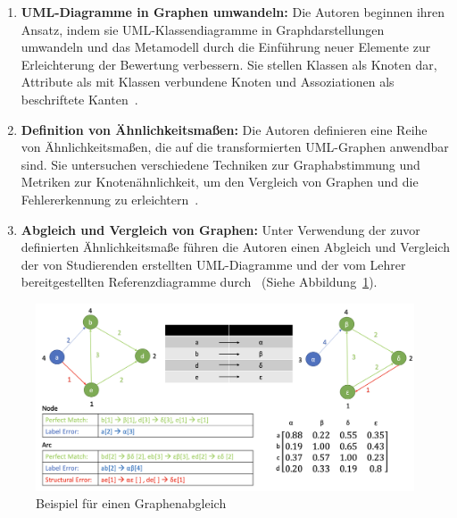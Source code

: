 \begin{enumerate}
    \item \textbf{UML-Diagramme in Graphen umwandeln:} Die Autoren beginnen ihren Ansatz, indem sie UML-Klassendiagramme
    in Graphdarstellungen umwandeln und das Metamodell durch die Einführung neuer Elemente zur Erleichterung der
    Bewertung verbessern. Sie stellen Klassen als Knoten dar, Attribute als mit Klassen verbundene Knoten und
    Assoziationen als beschriftete Kanten~\cite{auxepaules2015diagram}.

    \item \textbf{Definition von Ähnlichkeitsmaßen:} Die Autoren definieren eine Reihe von Ähnlichkeitsmaßen, die auf
    die transformierten UML-Graphen anwendbar sind. Sie untersuchen verschiedene Techniken zur Graphabstimmung und
    Metriken zur Knotenähnlichkeit, um den Vergleich von Graphen und die Fehlererkennung zu erleichtern~\cite{fauzan2018class}.

    \item \textbf{Abgleich und Vergleich von Graphen:} Unter Verwendung der zuvor definierten Ähnlichkeitsmaße führen
    die Autoren einen Abgleich und Vergleich der von Studierenden erstellten UML-Diagramme und der vom Lehrer
    bereitgestellten Referenzdiagramme durch~\cite{outair2017towards} (Siehe Abbildung~\ref{fig:graph-matching}).
\end{enumerate}


\begin{figure}
	\centering
	\includegraphics[width=15cm]{images/graph-matching}
	\caption{Beispiel für einen Graphenabgleich \cite{anas2021new}}
	\label{fig:graph-matching}
\end{figure}

